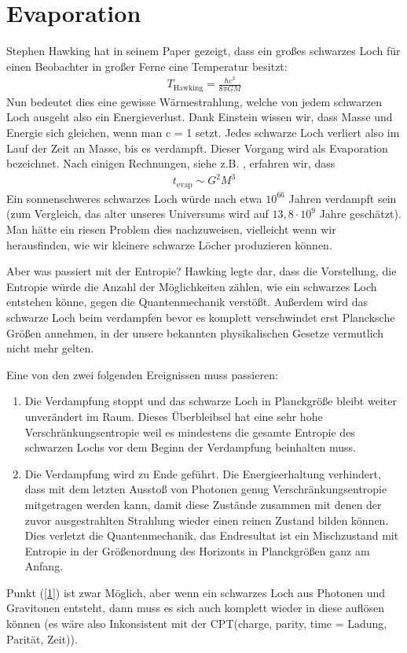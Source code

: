 \documentclass[ngerman]{scrartcl}
\begin{document}
\FloatBarrier
\section{Evaporation}
Stephen Hawking hat in seinem Paper \cite{ParticleCreation} gezeigt, dass ein großes schwarzes Loch für einen Beobachter in großer Ferne eine Temperatur besitzt:
	\begin{align}
		T_{\text{Hawking}} = \frac{\hbar c^3}{8 \pi GM}
	\end{align}
Nun bedeutet dies eine gewisse Wärmestrahlung, welche von jedem schwarzen Loch ausgeht also ein Energieverlust. Dank Einstein wissen wir, dass Masse und Energie sich gleichen, wenn man c = 1 setzt. Jedes schwarze Loch verliert also im Lauf der Zeit an Masse, bis es verdampft. Dieser Vorgang wird als Evaporation bezeichnet. Nach einigen Rechnungen, siehe z.B. \cite{JerusalemsLectures}, erfahren wir, dass
	\begin{align}
		t_{\text{evap}} \sim G^2 M^3
	\end{align}
Ein sonnenschweres schwarzes Loch würde nach etwa $10^{66}$ Jahren verdampft sein (zum Vergleich, das alter unseres Universums wird auf $13,8 \cdot 10^{9}$ Jahre geschätzt). Man hätte ein riesen Problem dies nachzuweisen, vielleicht wenn wir herausfinden, wie wir kleinere schwarze Löcher produzieren können. 

Aber was passiert mit der Entropie?
Hawking \cite{BreakdownGravitationalCollapse} legte dar, dass die Vorstellung, die Entropie würde die Anzahl der Möglichkeiten zählen, wie ein schwarzes Loch entstehen könne, gegen die Quantenmechanik verstößt.
Außerdem wird das schwarze Loch beim verdampfen bevor es komplett verschwindet erst Plancksche Größen annehmen, in der unsere bekannten physikalischen Gesetze vermutlich nicht mehr gelten. 

Eine von den zwei folgenden Ereignissen muss passieren:
	\begin{enumerate}[(1)]
		\item Die Verdampfung stoppt und das schwarze Loch in Planckgröße bleibt weiter unverändert im Raum. Dieses Überbleibsel hat eine sehr hohe Verschränkungsentropie weil es mindestens die gesamte Entropie des schwarzen Lochs vor dem Beginn der Verdampfung beinhalten muss. \label{1}
		
		\item Die Verdampfung wird zu Ende geführt. Die Energieerhaltung verhindert, dass mit dem letzten Ausstoß von Photonen genug Verschränkungsentropie mitgetragen werden kann, damit diese Zustände zusammen mit denen der zuvor ausgestrahlten Strahlung wieder einen reinen Zustand bilden können. Dies verletzt die Quantenmechanik, das Endresultat ist ein Mischzustand mit Entropie in der Größenordnung des Horizonts in Planckgrößen ganz am Anfang.  \label{2}
	\end{enumerate}
Punkt (\ref{1}) ist zwar Möglich, aber wenn ein schwarzes Loch aus Photonen und Gravitonen entsteht, dann muss es sich auch komplett wieder in diese auflösen können (es wäre also Inkonsistent mit der CPT(charge, parity, time = Ladung, Parität, Zeit)).
\end{document}

